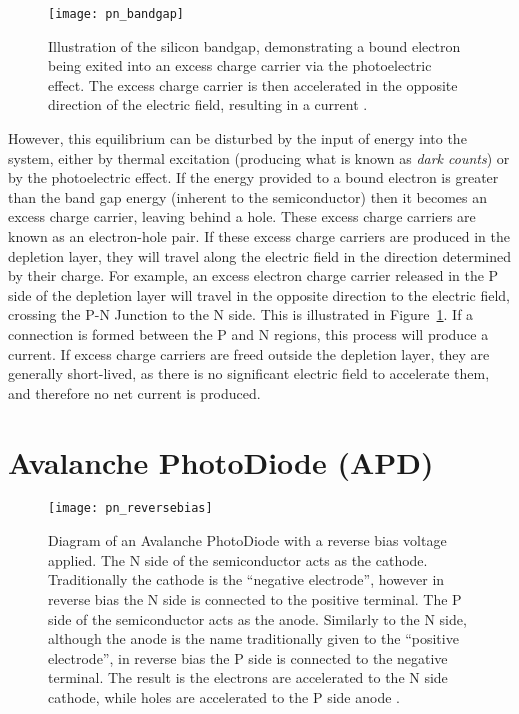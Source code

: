 \begin{figure}
	\centering
    \texttt{[image: pn\_bandgap]} 
	\caption[Illustration of the silicon bandgap.]{Illustration of the silicon bandgap, demonstrating a bound electron being exited into an excess charge carrier via the photoelectric effect. The excess charge carrier is then accelerated in the opposite direction of the electric field, resulting in a current \cite{Ghassemi2017}.}
	\label{fig:pn_bandgap}
\end{figure}

However, this equilibrium can be disturbed by the input of energy into the system, either by thermal excitation (producing what is known as \textit{dark counts}) or by the photoelectric effect. If the energy provided to a bound electron is greater than the band gap energy (inherent to the semiconductor) then it becomes an excess charge carrier, leaving behind a hole. These excess charge carriers are known as an electron-hole pair. If these excess charge carriers are produced in the depletion layer, they will travel along the electric field in the direction determined by their charge. For example, an excess electron charge carrier released in the P side of the depletion layer will travel in the opposite direction to the electric field, crossing the P-N Junction to the N side. This is illustrated in Figure~\ref{fig:pn_bandgap}. If a connection is formed between the P and N regions, this process will produce a current. If excess charge carriers are freed outside the depletion layer, they are generally short-lived, as there is no significant electric field to accelerate them, and therefore no net current is produced.

\section{Avalanche PhotoDiode (APD)}

\begin{figure}
	\centering
    \texttt{[image: pn\_reversebias]} 
	\caption[Diagram of an Avalanche PhotoDiode.]{Diagram of an Avalanche PhotoDiode with a reverse bias voltage applied. The N side of the semiconductor acts as the cathode. Traditionally the cathode is the ``negative electrode'', however in reverse bias the N side is connected to the positive terminal. The P side of the semiconductor acts as the anode. Similarly to the N side, although the anode is the name traditionally given to the ``positive electrode'', in reverse bias the P side is connected to the negative terminal. The result is the electrons are accelerated to the N side cathode, while holes are accelerated to the P side anode \cite{Ghassemi2017}.}
	\label{fig:pn_reversebias}
\end{figure}

